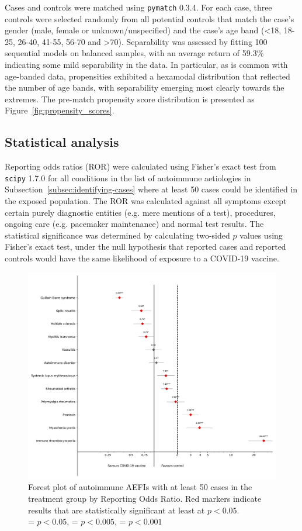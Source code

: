 \documentclass{article}
\begin{document}
Cases and controls were matched using \texttt{pymatch} 0.3.4.
For each case, three controls were selected randomly from all potential controls that match the case's gender (male, female or unknown/unspecified) and the case's age band (<18, 18-25, 26-40, 41-55, 56-70 and >70).
Separability was assessed by fitting 100 sequential models on balanced samples, with an average return of 59.3\% indicating some mild separability in the data.
In particular, as is common with age-banded data, propensities exhibited a hexamodal distribution that reflected the number of age bands, with separability emerging most clearly towards the extremes.
The pre-match propensity score distribution is presented as Figure~\ref{fig:propensity_scores}.
	
\subsection{Statistical analysis}

Reporting odds ratios (ROR) were calculated using Fisher's exact test from \texttt{scipy} 1.7.0 for all conditions in the list of autoimmune aetiologies in Subsection~\ref{subsec:identifying-cases} where at least 50 cases could be identified in the exposed population.
The ROR was calculated against all symptoms except certain purely diagnostic entities (e.g. mere mentions of a test), procedures, ongoing care (e.g. pacemaker maintenance) and normal test results.
The statistical significance was determined by calculating two-sided $p$ values using Fisher's exact test, under the null hypothesis that reported cases and reported controls would have the same likelihood of exposure to a COVID-19 vaccine.


\begin{figure}
    \includegraphics[width=12.5 cm]{forest_plot_by_etiology}
    \caption{Forest plot of autoimmune AEFIs with at least 50 cases in the treatment group by Reporting Odds Ratio. Red markers indicate results that are statistically significant at least at $p<0.05$. \\
    \textasteriskcentered = $p < 0.05$, \textasteriskcentered\textasteriskcentered = $p < 0.005$, \textasteriskcentered\textasteriskcentered\textasteriskcentered = $p < 0.001$}\label{fig:rors}
\end{figure}
\end{document}
